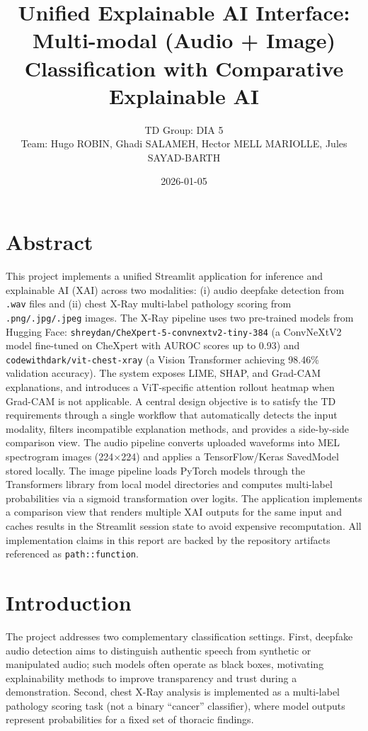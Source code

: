 \documentclass[11pt,a4paper]{article}
\title{Unified Explainable AI Interface:\\ Multi-modal (Audio + Image) Classification with Comparative Explainable AI}
\author{TD Group: DIA 5 \\ Team: Hugo ROBIN, Ghadi SALAMEH, Hector MELL MARIOLLE, Jules SAYAD-BARTH}
\date{2026-01-05}
\begin{document}
\maketitle

\section*{Abstract}
This project implements a unified Streamlit application for inference and explainable AI (XAI) across two modalities: (i) audio deepfake detection from \texttt{.wav} files and (ii) chest X-Ray multi-label pathology scoring from \texttt{.png/.jpg/.jpeg} images. The X-Ray pipeline uses two pre-trained models from Hugging Face: \texttt{shreydan/CheXpert-5-convnextv2-tiny-384} (a ConvNeXtV2 model fine-tuned on CheXpert with AUROC scores up to 0.93) and \texttt{codewithdark/vit-chest-xray} (a Vision Transformer achieving 98.46\% validation accuracy). The system exposes LIME, SHAP, and Grad-CAM explanations, and introduces a ViT-specific attention rollout heatmap when Grad-CAM is not applicable. A central design objective is to satisfy the TD requirements through a single workflow that automatically detects the input modality, filters incompatible explanation methods, and provides a side-by-side comparison view. The audio pipeline converts uploaded waveforms into MEL spectrogram images (224$\times$224) and applies a TensorFlow/Keras SavedModel stored locally. The image pipeline loads PyTorch models through the Transformers library from local model directories and computes multi-label probabilities via a sigmoid transformation over logits. The application implements a comparison view that renders multiple XAI outputs for the same input and caches results in the Streamlit session state to avoid expensive recomputation. All implementation claims in this report are backed by the repository artifacts referenced as \texttt{path::function}.

\section{Introduction}
The project addresses two complementary classification settings. First, deepfake audio detection aims to distinguish authentic speech from synthetic or manipulated audio; such models often operate as black boxes, motivating explainability methods to improve transparency and trust during a demonstration. Second, chest X-Ray analysis is implemented as a multi-label pathology scoring task (not a binary ``cancer'' classifier), where model outputs represent probabilities for a fixed set of thoracic findings.
\end{document}
